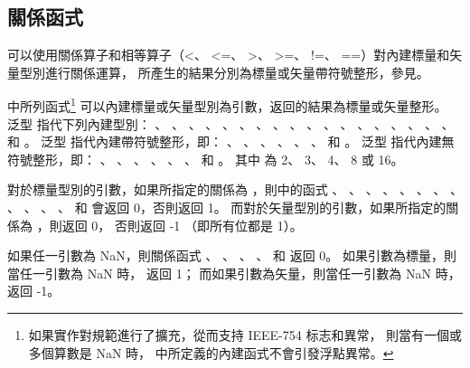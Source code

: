 \subsection[sec:relationFunc]{關係函式}

可以使用關係算子和相等算子（<、 <=、 >、 >=、 !=、 ==）對內建標量和矢量型別進行關係運算，
所產生的結果分別為標量或矢量帶符號整形，參見。

中所列函式\footnote{
如果實作對規範進行了擴充，從而支持 IEEE-754 标志和異常，
則當有一個或多個算數是 NaN 時，
中所定義的內建函式不會引發{}浮點異常。}
可以內建標量或矢量型別為引數，返回的結果為標量或矢量整形。
泛型  指代下列內建型別：
 、 、 、 、
 、 、 、 、
 、 、 、 、
 、 、 、 、
 、 、  和 。
泛型  指代內建帶符號整形，即：
 、 、 、 、
 、 、  和 。
泛型  指代內建無符號整形，即：
 、 、 、 、
 、 、  和 。
其中  為 2、 3、 4、 8 或 16。

對於標量型別的引數，如果所指定的關係為 {}，則中的函式
 、 、 、 、
 、 、 、 、
 、 、 、 、
  和  會返回 0，否則返回 1。
而對於矢量型別的引數，如果所指定的關係為 {}，則返回 0，
否則返回 -1 （即所有位都是 1）。

如果任一引數為 NaN，則關係函式
 、 、 、
 、  和 
返回 0。
如果引數為標量，則當任一引數為 NaN 時，  返回 1；
而如果引數為矢量，則當任一引數為 NaN 時，  返回 -1。

{}

